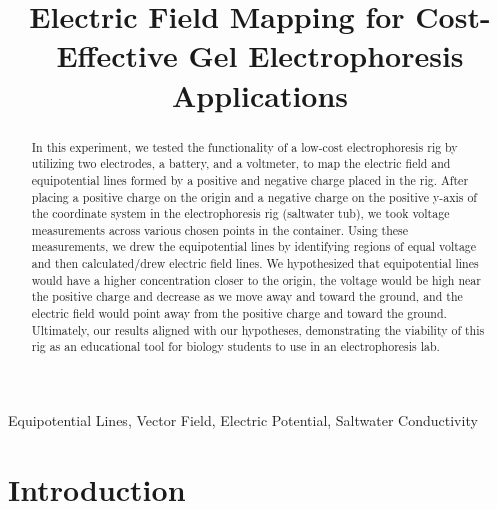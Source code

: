\documentclass[conference]{IEEEtran}
\begin{document}
\title{Electric Field Mapping for Cost-Effective Gel Electrophoresis Applications \\
}

\author{

\and
{}

\and
{}

\and
{}

\and
{}

}

\maketitle
\begin{abstract}
In this experiment, we tested the functionality of a low-cost electrophoresis rig by utilizing two electrodes, a battery, and a voltmeter, to map the electric field and equipotential lines formed by a positive and negative charge placed in the rig. After placing a positive charge on the origin and a negative charge on the positive y-axis of the coordinate system in the electrophoresis rig (saltwater tub), we took voltage measurements across various chosen points in the container. Using these measurements, we drew the equipotential lines by identifying regions of equal voltage and then calculated/drew electric field lines. We hypothesized that equipotential lines would have a higher concentration closer to the origin, the voltage would be high near the positive charge and decrease as we move away and toward the ground, and the electric field would point away from the positive charge and toward the ground. Ultimately, our results aligned with our hypotheses, demonstrating the viability of this rig as an educational tool for biology students to use in an electrophoresis lab.
\end{abstract}


\begin{IEEEkeywords}
Equipotential Lines, Vector Field, Electric Potential, Saltwater Conductivity
\end{IEEEkeywords}

\section{Introduction}
\end{document}
